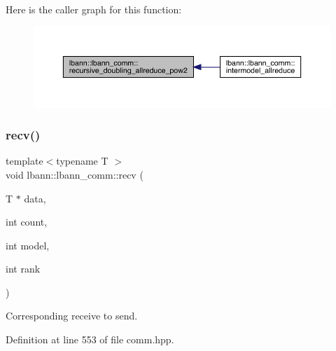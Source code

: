 Here is the caller graph for this function\+:\nopagebreak
\begin{figure}[H]
\begin{center}
\leavevmode
\includegraphics[width=350pt]{classlbann_1_1lbann__comm_a99bc2f8128f0b0e2ebdf876a3a343635_icgraph}
\end{center}
\end{figure}
\mbox{\label{classlbann_1_1lbann__comm_af8842cd4cea390f76d9146e1c4578de4}} 
\subsubsection{\texorpdfstring{recv()}{recv()}\hspace{0.1cm}{\footnotesize\ttfamily [1/9]}}
{\footnotesize\ttfamily template$<$typename T $>$ \\
void lbann\+::lbann\+\_\+comm\+::recv (\begin{DoxyParamCaption}\item[{T $\ast$}]{data,  }\item[{int}]{count,  }\item[{int}]{model,  }\item[{int}]{rank }\end{DoxyParamCaption})\hspace{0.3cm}{\ttfamily [inline]}}

Corresponding receive to send. 

Definition at line 553 of file comm.\+hpp.


